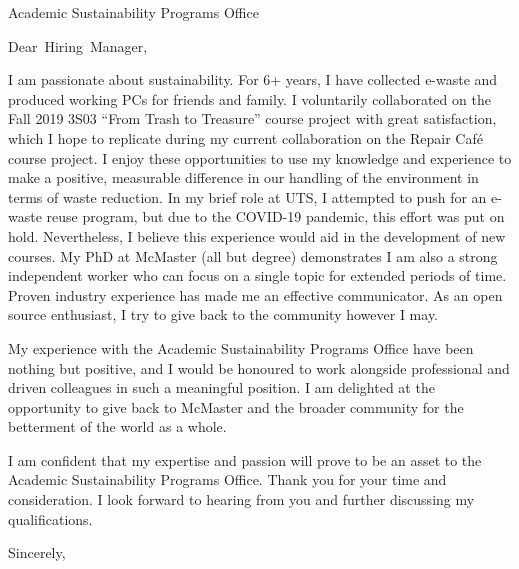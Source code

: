\documentclass[
fontsize=12pt,
paper=letter,
parskip=half,
enlargefirstpage=on,    %
fromalign=right,        %
fromphone=on,           %
fromemail=on,
fromrule=aftername,     %
addrfield=off,           %
backaddress=off,         %
subject=beforeopening,  %
locfield=narrow,        %
foldmarks=off,           %
]{scrlttr2}
\renewcommand{\\}{\ {\large\textperiodcentered}\ }
\begin{document}

\begin{letter}{Academic Sustainability Programs Office}


\opening{Dear~Hiring~Manager,}

I am passionate about sustainability.
For 6+ years, I have collected e-waste and produced working PCs for friends and family.
I voluntarily collaborated on the Fall 2019 3S03 ``From Trash to Treasure'' course project with great satisfaction, which I hope to replicate during my current collaboration on the Repair Caf\'{e} course project.
I enjoy these opportunities to use my knowledge and experience to make a positive, measurable difference in our handling of the environment in terms of waste reduction.
In my brief role at UTS, I attempted to push for an e-waste reuse program, but due to the COVID-19 pandemic, this effort was put on hold.
Nevertheless, I believe this experience would aid in the development of new courses.
My PhD at McMaster (all but degree) demonstrates I am also a strong independent worker who can focus on a single topic for extended periods of time.
Proven industry experience has made me an effective communicator.
As an open source enthusiast, I try to give back to the community however I may.

My experience with the Academic Sustainability Programs Office have been nothing but positive, and I would be honoured to work alongside professional and driven colleagues in such a meaningful position.
I am delighted at the opportunity to give back to McMaster and the broader community for the betterment of the world as a whole.

I am confident that my expertise and passion will prove to be an asset to the Academic Sustainability Programs Office.
Thank you for your time and consideration.
I look forward to hearing from you and further discussing my qualifications.
\closing{Sincerely,}


\end{letter}
\end{document}
